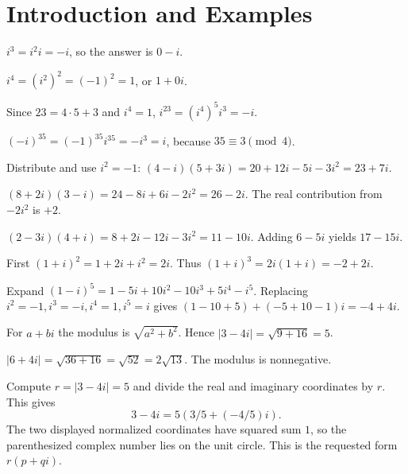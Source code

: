 \section{Introduction and Examples}


$i^3=i^2i=-i$, so the answer is $0-i$.


$i^4=(i^2)^2=(-1)^2=1$, or $1+0i$.


Since $23=4\cdot5+3$ and $i^4=1$, $i^{23}=(i^4)^5i^3=-i$.


$(-i)^{35}=(-1)^{35}i^{35}=-i^3=i$, because $35\equiv3\pmod4$.


Distribute and use $i^2=-1$: $(4-i)(5+3i)=20+12i-5i-3i^2=23+7i$.


$(8+2i)(3-i)=24-8i+6i-2i^2=26-2i$. The real contribution from $-2i^2$ is $+2$.


$(2-3i)(4+i)=8+2i-12i-3i^2=11-10i$. Adding $6-5i$ yields $17-15i$.


First $(1+i)^2=1+2i+i^2=2i$. Thus $(1+i)^3=2i(1+i)=-2+2i$.


Expand $(1-i)^5=1-5i+10i^2-10i^3+5i^4-i^5$. Replacing $i^2=-1,i^3=-i,i^4=1,i^5=i$ gives $(1-10+5)+(-5+10-1)i=-4+4i$.


For $a+bi$ the modulus is $\sqrt{a^2+b^2}$. Hence $|3-4i|=\sqrt{9+16}=5$.


$|6+4i|=\sqrt{36+16}=\sqrt{52}=2\sqrt{13}$. The modulus is nonnegative.


Compute $r=|3-4i|=5$ and divide the real and imaginary coordinates by $r$. This gives
\[3-4i=5\left(3/5+\left(-4/5\right)i\right).
\]
The two displayed normalized coordinates have squared sum $1$, so the parenthesized complex number lies on the unit circle. This is the requested form $r(p+qi)$.

